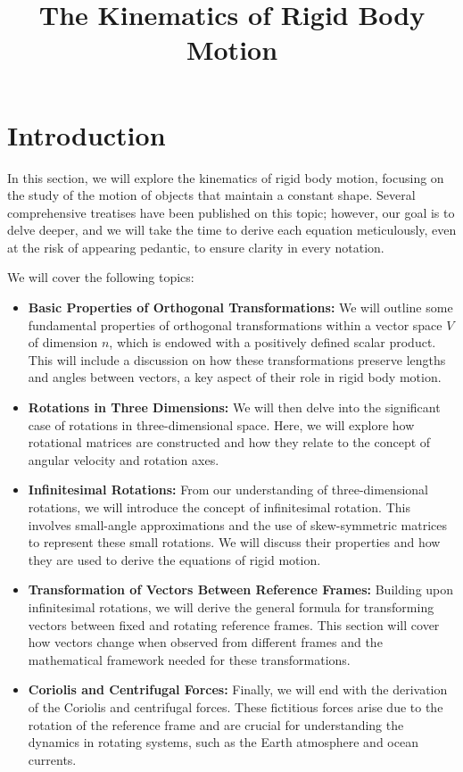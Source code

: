 \documentclass[12pt]{article}
\title{The Kinematics of Rigid Body Motion}
\author{}
\date{}
\begin{document}
\maketitle
 

\section{Introduction}

In this section, we will explore the kinematics of rigid body motion, focusing on the study
of the motion of objects that maintain a constant shape. Several comprehensive treatises have
been published on this topic; however, our goal is to delve deeper, and we will take the time
to derive each equation meticulously, even at the risk of appearing pedantic, to ensure
clarity in every notation.

We will cover the following topics:

\begin{itemize}
  \item \textbf{Basic Properties of Orthogonal Transformations:} We will outline some
        fundamental properties of orthogonal transformations within a vector space $V$ of
        dimension $n$, which is endowed with a positively defined scalar product. This will
        include a discussion on how these transformations preserve lengths and angles between
        vectors, a key aspect of their role in rigid body motion.
  \item \textbf{Rotations in Three Dimensions:} We will then delve into the significant case
        of rotations in three-dimensional space. Here, we will explore how rotational matrices
        are constructed and how they relate to the concept of angular velocity and rotation
        axes.
  \item \textbf{Infinitesimal Rotations:} From our understanding of three-dimensional
        rotations, we will introduce the concept of infinitesimal rotation. This involves
        small-angle approximations and the use of skew-symmetric matrices to represent these
        small rotations. We will discuss their properties and how they are used to derive the
        equations of rigid motion.
  \item \textbf{Transformation of Vectors Between Reference Frames:} Building upon
        infinitesimal rotations, we will derive the general formula for transforming vectors
        between fixed and rotating reference frames. This section will cover how vectors
        change when observed from different frames and the mathematical framework needed for
        these transformations.
  \item \textbf{Coriolis and Centrifugal Forces:} Finally, we will end with the derivation of
        the Coriolis and centrifugal forces. These fictitious forces arise due to the rotation
        of the reference frame and are crucial for understanding the dynamics in rotating
        systems, such as the Earth atmosphere and ocean currents.
\end{itemize}
\end{document}
